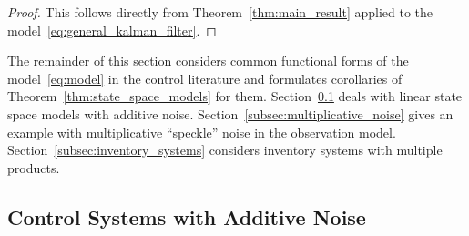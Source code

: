 \documentclass[11pt,onecolumn]{IEEEtran}  %
\theoremstyle{definition}
\begin{document}
\begin{proof}
    This follows directly from Theorem~\ref{thm:main_result} applied to the model~\eqref{eq:general_kalman_filter}.
\end{proof}

The remainder of this section considers common functional forms of the model~\eqref{eq:model} in the control literature and formulates corollaries of Theorem~\ref{thm:state_space_models} for them. Section~\ref{subsec:additive_noise} deals with linear state space models with additive noise. Section~\ref{subsec:multiplicative_noise} gives an example with multiplicative ``speckle'' noise in the observation model. Section~\ref{subsec:inventory_systems} considers inventory systems with multiple products.

\subsection{Control Systems with Additive Noise} \label{subsec:additive_noise}
\end{document}
